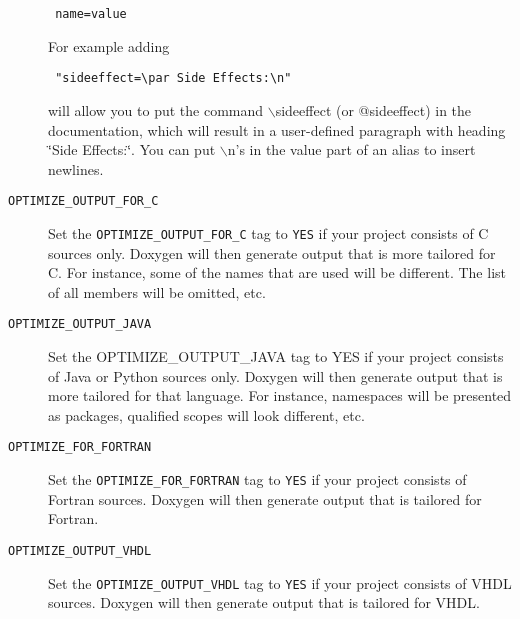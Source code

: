 \begin{description}
\footnotesize\begin{verbatim}
 name=value
\end{verbatim}
\normalsize
 For example adding 

\footnotesize\begin{verbatim}
 "sideeffect=\par Side Effects:\n" 
\end{verbatim}
\normalsize
 will allow you to put the command $\backslash$sideeffect (or @sideeffect) in the documentation, which will result in a user-defined paragraph with heading \char`\"{}Side Effects:\char`\"{}. You can put $\backslash$n's in the value part of an alias to insert newlines.

\label{config_cfg_optimize_output_for_c}
\hypertarget{config_cfg_optimize_output_for_c}{}
 \item[{\tt OPTIMIZE\_\-OUTPUT\_\-FOR\_\-C} ] Set the {\tt OPTIMIZE\_\-OUTPUT\_\-FOR\_\-C} tag to {\tt YES} if your project consists of C sources only. Doxygen will then generate output that is more tailored for C. For instance, some of the names that are used will be different. The list of all members will be omitted, etc.

\label{config_cfg_optimize_output_java}
\hypertarget{config_cfg_optimize_output_java}{}
 \item[{\tt OPTIMIZE\_\-OUTPUT\_\-JAVA} ] Set the OPTIMIZE\_\-OUTPUT\_\-JAVA tag to YES if your project consists of Java or Python sources only. Doxygen will then generate output that is more tailored for that language. For instance, namespaces will be presented as packages, qualified scopes will look different, etc.

\label{config_cfg_optimize_for_fortran}
\hypertarget{config_cfg_optimize_for_fortran}{}
 \item[{\tt OPTIMIZE\_\-FOR\_\-FORTRAN} ] Set the {\tt OPTIMIZE\_\-FOR\_\-FORTRAN} tag to {\tt YES} if your project consists of Fortran sources. Doxygen will then generate output that is tailored for Fortran.

\label{config_cfg_optimize_output_vhdl}
\hypertarget{config_cfg_optimize_output_vhdl}{}
 \item[{\tt OPTIMIZE\_\-OUTPUT\_\-VHDL} ] Set the {\tt OPTIMIZE\_\-OUTPUT\_\-VHDL} tag to {\tt YES} if your project consists of VHDL sources. Doxygen will then generate output that is tailored for VHDL.


\end{description}
